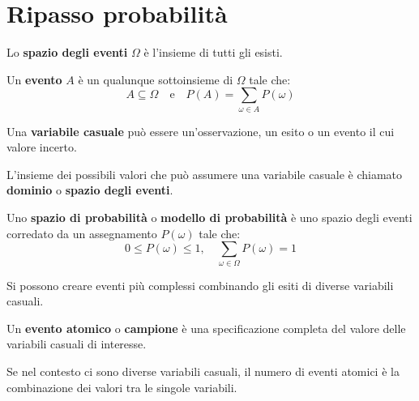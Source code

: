 \chapter{Ripasso probabilità}
\begin{definizione}
    Lo \textbf{spazio degli eventi} $\Omega$ è l'insieme di tutti gli esisti.
\end{definizione}
\begin{definizione}
    Un \textbf{evento} $A$ è un qualunque sottoinsieme di $\Omega$ tale che:
    \begin{equation*}
        A \subseteq \Omega \quad \text{e} \quad P(A) = \sum_{\omega \in A} P(\omega)
    \end{equation*}
\end{definizione}
\begin{definizione}
    Una \textbf{variabile casuale} può essere un'osservazione, un esito o un
    evento il cui valore incerto.
\end{definizione}
L'insieme dei possibili valori che può assumere una variabile casuale è chiamato
\textbf{dominio} o \textbf{spazio degli eventi}.
\begin{definizione}
    Uno \textbf{spazio di probabilità} o \textbf{modello di probabilità} è uno
    spazio degli eventi corredato da un assegnamento $P(\omega)$ tale che:
    \begin{equation*}
        0 \leq P(\omega) \leq 1, \quad \sum_{\omega \in \Omega} P(\omega) = 1
    \end{equation*}
\end{definizione}
Si possono creare eventi più complessi combinando gli esiti di diverse variabili
casuali.
\begin{definizione}
    Un \textbf{evento atomico} o \textbf{campione} è una specificazione completa
    del valore delle variabili casuali di interesse.
\end{definizione}
Se nel contesto ci sono diverse variabili casuali, il numero di eventi atomici
è la combinazione dei valori tra le singole variabili.

